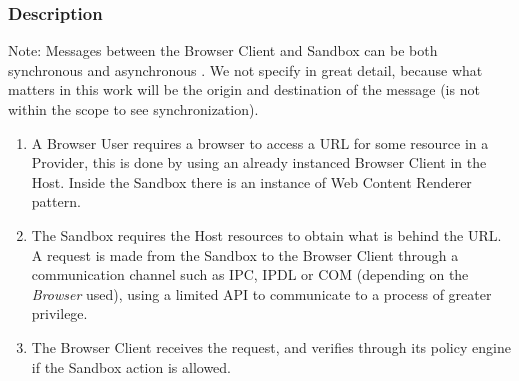 \documentclass{sig-alternate-05-2015}
\begin{document}
    \subsubsection*{Description}
    Note: Messages between the Browser Client and Sandbox can be both synchronous and asynchronous \cite{firefoxIPC,GCIPC} . We not specify in great detail, because what matters in this work will be the origin and destination of the message (is not within the scope to see synchronization).
      \begin{enumerate}
        \item A Browser User requires a browser to access a URL for some resource in a Provider, this is done by using an already instanced Browser Client in the Host. Inside the Sandbox there is an instance of Web Content Renderer pattern.
        \item The Sandbox requires the Host resources to obtain what is behind the URL. A request is made from the Sandbox to the Browser Client through a communication channel such as IPC, IPDL or COM (depending on the \textit{Browser} used), using a limited API to communicate to a process of greater privilege.
        \item The Browser Client receives the request, and verifies through its policy engine if the Sandbox action is allowed.


\end{enumerate}
\end{document}
